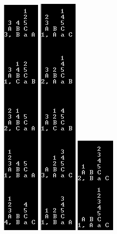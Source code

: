 \includegraphics{Recursion/img/TareaA_5.png}
\includegraphics{Recursion/img/TareaA_6.png}
\includegraphics{Recursion/img/TareaA_7.png}